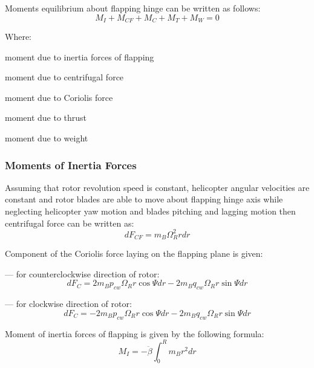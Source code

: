 \begin{minipage}{\textwidth}
  Moments equilibrium about flapping hinge can be written as follows: \cite{GessowMyers1985}
  \begin{equation}
    \label{eq-aero-blade-moments-equilibrium}
    M_I + M_{CF} + M_C + M_T + M_W = 0
  \end{equation}

  Where:
  \begin{description}[align=right,labelwidth=1.5cm]
    \item [$M_I$]    [N$\cdot$m] moment due to inertia forces of flapping
    \item [$M_{CF}$] [N$\cdot$m] moment due to centrifugal force
    \item [$M_C$]    [N$\cdot$m] moment due to Coriolis force
    \item [$M_T$]    [N$\cdot$m] moment due to thrust
    \item [$M_W$]    [N$\cdot$m] moment due to weight
  \end{description}
\end{minipage}

\subsubsection{Moments of Inertia Forces}

Assuming that rotor revolution speed is constant, helicopter angular velocities are constant and rotor blades are able to move about flapping hinge axis while neglecting helicopter yaw motion and blades pitching and lagging motion then centrifugal force can be written as:
\begin{equation}
  dF_{CF} = m_B \Omega_R^2 r dr
\end{equation}

Component of the Coriolis force laying on the flapping plane is given:

--- for counterclockwise direction of rotor:
\begin{equation}
  dF_C =
    2 m_B p_{cw} \Omega_R r \cos \Psi dr
  - 2 m_B q_{cw} \Omega_R r \sin \Psi dr
\end{equation}

--- for clockwise direction of rotor:
\begin{equation}
  dF_C =
  - 2 m_B p_{cw} \Omega_R r \cos \Psi dr
  - 2 m_B q_{cw} \Omega_R r \sin \Psi dr
\end{equation}

Moment of inertia forces of flapping is given by the following formula:
\begin{equation}
  M_I = - \ddot \beta \int_{0}^{R} m_B r^2 dr
\end{equation}

